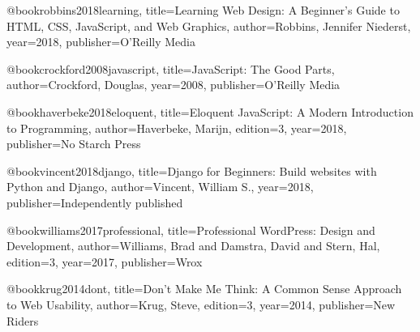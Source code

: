 \documentclass[a4paper, oneside, 12pt, final]{extreport}
\begin{document}
 
 


\nocite{*}







%




@book{robbins2018learning,
  title={Learning Web Design: A Beginner's Guide to HTML, CSS, JavaScript, and Web Graphics},
  author={Robbins, Jennifer Niederst},
  year={2018},
  publisher={O'Reilly Media}
}

@book{crockford2008javascript,
  title={JavaScript: The Good Parts},
  author={Crockford, Douglas},
  year={2008},
  publisher={O'Reilly Media}
}

@book{haverbeke2018eloquent,
  title={Eloquent JavaScript: A Modern Introduction to Programming},
  author={Haverbeke, Marijn},
  edition={3},
  year={2018},
  publisher={No Starch Press}
}

@book{vincent2018django,
  title={Django for Beginners: Build websites with Python and Django},
  author={Vincent, William S.},
  year={2018},
  publisher={Independently published}
}

@book{williams2017professional,
  title={Professional WordPress: Design and Development},
  author={Williams, Brad and Damstra, David and Stern, Hal},
  edition={3},
  year={2017},
  publisher={Wrox}
}

@book{krug2014dont,
  title={Don't Make Me Think: A Common Sense Approach to Web Usability},
  author={Krug, Steve},
  edition={3},
  year={2014},
  publisher={New Riders}
}






\cleardoublepage%


\printglossaries
\printindex

%
\end{document}
